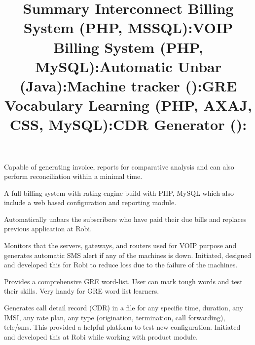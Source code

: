 \begin{resume}
\title{\textbf{Summary Interconnect Billing System (PHP, MSSQL):}}
\begin{position}
Capable of generating invoice, reports for comparative analysis and can also perform reconciliation within a minimal time.
\end{position}
\title{\textbf{VOIP Billing System (PHP, MySQL):}}
\begin{position}
A full billing system with rating engine build with PHP, MySQL which also include a web based configuration and reporting module.  
\end{position}
\title{\textbf{Automatic Unbar (Java):}}
\begin{position}
Automatically unbars the subscribers who have paid their due bills and replaces previous application at Robi.
\end{position}

\title{\textbf{Machine tracker (\BCSharp):}}
\begin{position}
Monitors that the servers, gateways, and routers used for VOIP purpose and generates automatic SMS alert if any of the machines is down. Initiated, designed and developed this for Robi to reduce loss due to the failure of the machines.
\end{position}

\title{\textbf{GRE Vocabulary Learning (PHP, AXAJ, CSS, MySQL):}}
\begin{position}
Provides a comprehensive GRE word-list. User can mark tough words and test their skills. Very handy for GRE word list learners.
\end{position}

\title{\textbf{CDR Generator (\BCSharp):}}
\begin{position}
Generates call detail record (CDR) in a file for any specific time, duration, any IMSI, any rate plan, any type (origination, termination, call forwarding), tele/sms. This provided a helpful platform to test new configuration. Initiated and developed this at Robi while working with product module.
\end{position}




\end{resume}
